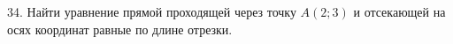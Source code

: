 34. Найти уравнение прямой проходящей через точку $A(2;3)$ и отсекающей на осях координат равные по длине отрезки.\\
